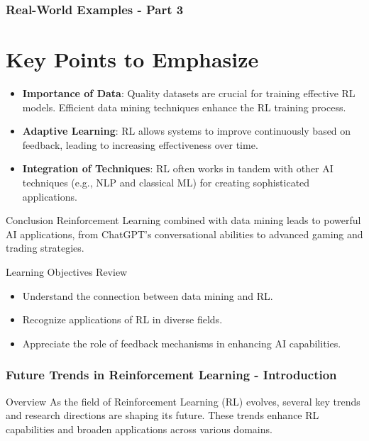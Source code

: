 \documentclass[aspectratio=169]{beamer}
\begin{document}
\begin{frame}[fragile]
    \frametitle{Real-World Examples - Part 3}
    \section*{Key Points to Emphasize}

    \begin{itemize}
        \item \textbf{Importance of Data}: Quality datasets are crucial for training effective RL models. Efficient data mining techniques enhance the RL training process.
        \item \textbf{Adaptive Learning}: RL allows systems to improve continuously based on feedback, leading to increasing effectiveness over time.
        \item \textbf{Integration of Techniques}: RL often works in tandem with other AI techniques (e.g., NLP and classical ML) for creating sophisticated applications.
    \end{itemize}
    
    \begin{block}{Conclusion}
        Reinforcement Learning combined with data mining leads to powerful AI applications, from ChatGPT’s conversational abilities to advanced gaming and trading strategies.
    \end{block}
    
    \begin{block}{Learning Objectives Review}
        \begin{itemize}
            \item Understand the connection between data mining and RL.
            \item Recognize applications of RL in diverse fields.
            \item Appreciate the role of feedback mechanisms in enhancing AI capabilities.
        \end{itemize}
    \end{block}
\end{frame}

\begin{frame}[fragile]
    \frametitle{Future Trends in Reinforcement Learning - Introduction}
    \begin{block}{Overview}
        As the field of Reinforcement Learning (RL) evolves, several key trends and research directions are shaping its future. 
        These trends enhance RL capabilities and broaden applications across various domains.
    \end{block}
\end{frame}
\end{document}
